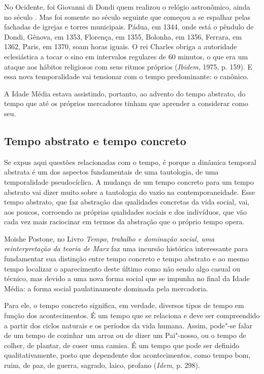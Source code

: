 No Ocidente, foi Giovanni di Dondi quem realizou o relógio astronômico,
ainda no século . Mas foi somente no século seguinte que começou a
se espalhar pelas fachadas de igrejas e torres municipais. Pádua, em
1344, onde está o pêndulo de Dondi, Gênova, em 1353, Florença, em 1355,
Bolonha, em 1356, Ferrara, em 1362, Paris, em 1370, soam horas iguais. O
rei Charles  obriga a autoridade eclesiástica a tocar o sino em
intervalos regulares de 60 minutos, o que era um ataque aos hábitos
religiosos com seus ritmos próprios (\emph{Ibidem}, 1975, p. 159). E
essa nova temporalidade vai tensionar com o tempo predominante: o
canônico.

A Idade Média estava assistindo, portanto, ao advento do tempo abstrato,
do tempo que até os próprios mercadores tinham que aprender a considerar
como seu.

\subsection{Tempo abstrato e tempo concreto}

Se expus aqui questões relacionadas com o tempo, é porque a dinâmica
temporal abstrata é um dos aspectos fundamentais de uma tautologia, de
uma temporalidade pseudocíclica. A mudança de um tempo concreto para um
tempo abstrato vai dizer muito sobre a tautologia do vazio na
contemporaneidade. Esse tempo abstrato,
que faz abstração das qualidades concretas da vida social, vai, aos
poucos, corroendo as próprias qualidades sociais e dos indivíduos, que
vão cada vez mais raciocinar em termos da abstração que o próprio tempo
opera.

Moishe Postone, no Livro \emph{Tempo, trabalho e dominação social, uma
reinterpretação da teoria de Marx} faz uma incursão histórica
interessante para fundamentar sua distinção entre tempo concreto e tempo
abstrato e ao mesmo tempo localizar o aparecimento deste último como não
sendo algo casual ou técnico, mas devido a uma nova forma social que se
impunha no final da Idade Média: a forma social paulatinamente dominada
pela mercadoria.

Para ele, o tempo concreto significa, em verdade, diversos tipos de
tempo em função dos acontecimentos. É um tempo que se relaciona e deve
ser compreendido a partir dos ciclos naturais e os períodos da vida
humana. Assim, pode"-se falar de um tempo de cozinhar um arroz ou de
dizer um Pai"-nosso, ou o tempo de colher, de plantar, de coser uma
camisa. É um tempo que pode ser definido qualitativamente, posto que
dependente dos acontecimentos, como tempo bom, ruim, de paz, de guerra,
sagrado, laico, profano (\emph{Idem}, p. 298).


